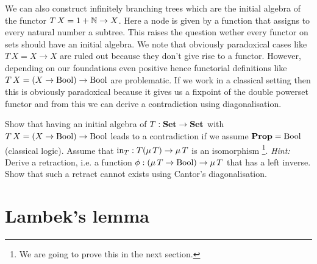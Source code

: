 We can also construct infinitely branching trees which are the initial algebra of the functor $T\,X = 1 + \mathbb{N} \to X$. Here a node is given by a function that assigns to every natural number a subtree. This raises the question wether every functor on sets should have an initial algebra. We note that obviously paradoxical cases like $T\,X = X \to X$ are ruled out because they don't give rise to a functor. However, depending on our foundations even positive hence functorial definitions like $T\,X = (X \to \mathrm{Bool}) \to \mathrm{Bool}$ are problematic. If we work in a classical setting then this is obviously paradoxical because it gives us a fixpoint of the double powerset functor and from this we can derive a contradiction using diagonalisation.
\begin{exercise}
Show that having an initial algebra of $T : \mathbf{Set} \to \mathbf{Set}$ with $T\,X = (X \to \mathrm{Bool}) \to \mathrm{Bool}$ leads to a contradiction if we assume $\mathbf{Prop} = \mathrm{Bool}$ (classical logic). Assume that $\mathrm{in}_T : T (\mu\,T) \to \mu\,T$ is an isomorphism
\footnote{We are going to prove this in the next section.}.
\emph{Hint:} Derive a retraction, i.e. a function $\phi : (\mu\,T \to \mathrm{Bool}) \to \mu\,T$ that has a left inverse. Show that such a retract cannot exists using Cantor's diagonalisation.
\end{exercise}

\section{Lambek's lemma}
\label{sec:lambeks-lemma}

